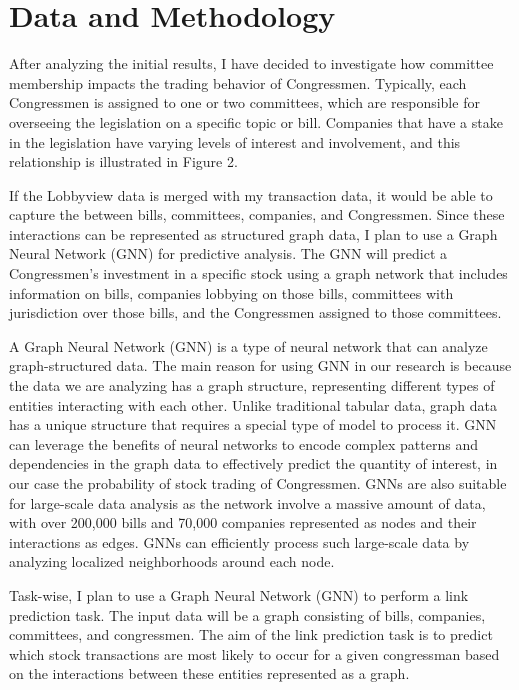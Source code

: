 \documentclass[15pt,letterpaper]{article}
\begin{document}
\section{Data and Methodology}
After analyzing the initial results, I have decided to investigate how committee membership impacts the trading behavior of Congressmen. Typically, each Congressmen is assigned to one or two committees, which are responsible for overseeing the legislation on a specific topic or bill. Companies that have a stake in the legislation have varying levels of interest and involvement, and this relationship is illustrated in Figure 2.

If the Lobbyview data is merged with my transaction data, it would be able to capture the 
 between bills, committees, companies, and Congressmen. Since these interactions can be represented as structured graph data, I plan to use a Graph Neural Network (GNN) for predictive analysis. The GNN will predict a Congressmen's investment in a specific stock using a graph network that includes information on bills, companies lobbying on those bills, committees with jurisdiction over those bills, and the Congressmen assigned to those committees.

A Graph Neural Network (GNN) is a type of neural network that can analyze graph-structured data. The main reason for using GNN in our research is because the data we are analyzing has a graph structure, representing different types of entities interacting with each other. Unlike traditional tabular data, graph data has a unique structure that requires a special type of model to process it. GNN can leverage the benefits of neural networks to encode complex patterns and dependencies in the graph data to effectively predict the quantity of interest, in our case the probability of stock trading of Congressmen. GNNs are also suitable for large-scale data analysis as the network involve a massive amount of data, with over 200,000 bills and 70,000 companies represented as nodes and their interactions as edges. GNNs can efficiently process such large-scale data by analyzing localized neighborhoods around each node.

Task-wise, I plan to use a Graph Neural Network (GNN) to perform a link prediction task. The input data will be a graph consisting of bills, companies, committees, and congressmen. The aim of the link prediction task is to predict which stock transactions are most likely to occur for a given congressman based on the interactions between these entities represented as a graph.
\end{document}
